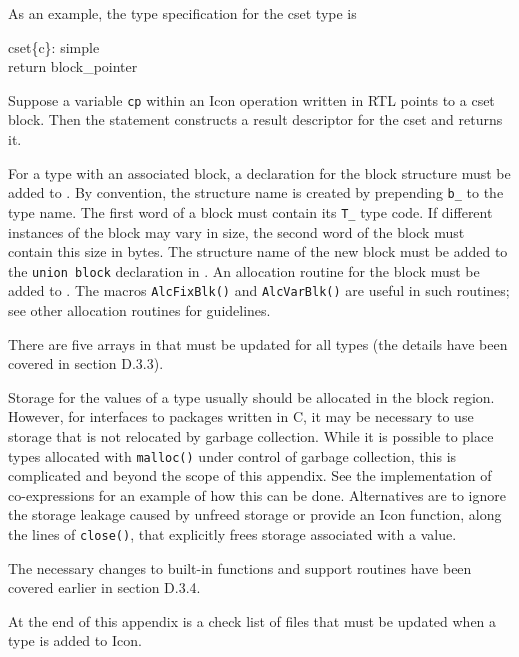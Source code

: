 As an example, the type specification for the cset type is
\begin{iconcode}
cset\{c\}:\>\>\> simple\\
\>\>\>           return block\_pointer
\end{iconcode}

\noindent
Suppose a variable \texttt{cp} within an Icon operation written in RTL
points to a cset block. Then the statement
\noindent
constructs a result descriptor for the cset and returns it.

For a type with an associated block, a declaration for the block
structure must be added to . By convention, the
structure name is created by prepending \texttt{b\_} to the type name.
The first word of a block must contain its \texttt{T\_} type code. If
different instances of the block may vary in size, the second word of
the block must contain this size in bytes. The structure name of the
new block must be added to the \texttt{union block} declaration
in . An allocation routine for the block must be
added to . The macros \texttt{AlcFixBlk()} and
\texttt{AlcVarBlk()} are useful in such routines; see other allocation
routines for guidelines.


There are five arrays in  that must be
updated for all types (the details have been covered in section D.3.3).

Storage for the values of a type usually should be allocated in the
block region. However, for interfaces to packages written in C, it may
be necessary to use storage that is not relocated by garbage
collection. While it is possible to place types allocated with
\texttt{malloc()} under control of garbage collection, this is
complicated and beyond the scope of this appendix. See the
implementation of co-expressions for an example of how this can be
done.
%
Alternatives are to ignore the storage leakage caused by unfreed
storage or provide an Icon function, along the lines of \texttt{close()},
that explicitly frees storage associated with a value.

The necessary changes to built-in functions and support routines have
been covered earlier in section D.3.4.

At the end of this appendix is a check list of files that must be
updated when a type is added to Icon.

